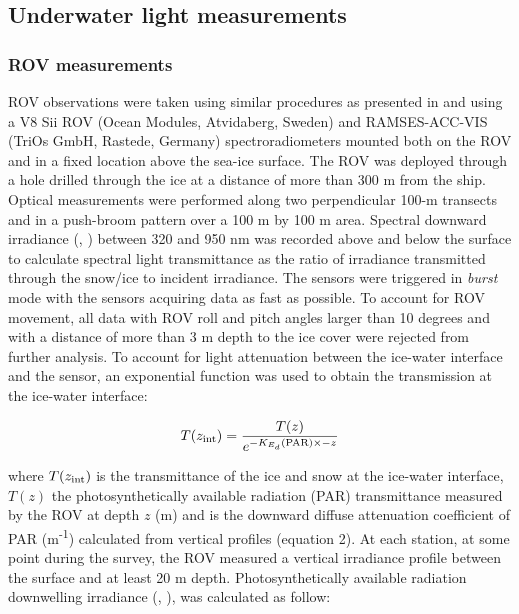 \subsection{Underwater light measurements}

\subsubsection{ROV measurements}

ROV observations were taken using similar procedures as presented in \citet{Nicolaus2013} and \citet{Katlein2017} using a V8 Sii ROV (Ocean Modules, Atvidaberg, Sweden) and RAMSES-ACC-VIS (TriOs GmbH, Rastede, Germany) spectroradiometers mounted both on the ROV and in a fixed location above the sea-ice surface. The ROV was deployed through a hole drilled through the ice at a distance of more than 300 m from the ship. Optical measurements were performed along two perpendicular 100-m transects and in a push-broom pattern over a 100 m by 100 m area. Spectral downward irradiance (\ed{}, \wmsquare) between 320 and 950 nm was recorded above and below the surface to calculate spectral light transmittance as the ratio of irradiance transmitted through the snow/ice to incident irradiance. The sensors were triggered in \textit{burst} mode with the sensors acquiring data as fast as possible. To account for ROV movement, all data with ROV roll and pitch angles larger than 10 degrees and with a distance of more than 3 m depth to the ice cover were rejected from further analysis. To account for light attenuation between the ice-water interface and the sensor, an exponential function was used to obtain the transmission at the ice-water interface:

\begin{linenomath*}
	\begin{equation}
		T(z_\textnormal{int}) = \frac{T(z)}{e^{-K_{E_d}(\textnormal{PAR}){} \times -z}}
	\end{equation}
\end{linenomath*}

\noindent where $T(z_\textnormal{int})$ is the transmittance of the ice and snow at the ice-water interface, $T(z)$ the photosynthetically available radiation (PAR) transmittance measured by the ROV at depth $z$ (m) and \kdpar{} is the downward diffuse attenuation coefficient of PAR (m\textsuperscript{-1}) calculated from \epar{} vertical profiles (equation 2). At each station, at some point during the survey, the ROV measured a vertical irradiance profile between the surface and at least 20 m depth. Photosynthetically available radiation downwelling irradiance (\eparz{}, \micromol{}), was calculated as follow:

